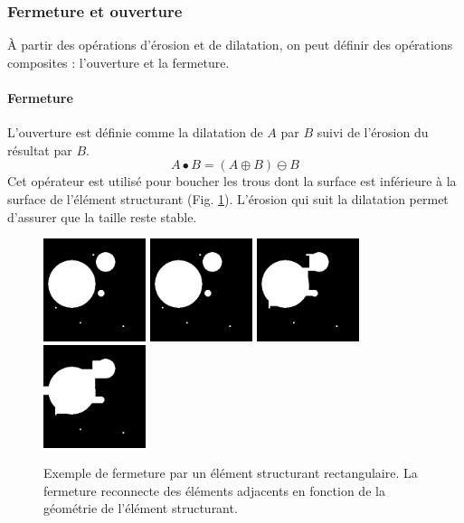   \subsubsection{Fermeture et ouverture}
  À partir des opérations d'érosion et de dilatation, on peut définir des opérations composites : l'ouverture et la fermeture.
  \paragraph{Fermeture}
  L'ouverture est définie comme la dilatation de $A$ par $B$ suivi de l'érosion du résultat par $B$.
  \begin{equation}
   A \bullet B = (A \oplus B) \ominus B
  \end{equation}  
  Cet opérateur est utilisé pour boucher les trous dont la surface est inférieure à la surface de l'élément structurant (Fig. \ref{fig:morpho_femerture}). L'érosion qui suit la dilatation permet d'assurer que la taille reste stable.
  
  \begin{figure}[h]
    \centering
    \includegraphics[height=3cm]{Images/morpho_init.png}
    \includegraphics[height=3cm]{Images/morpho_close_k5.png}
    \includegraphics[height=3cm]{Images/morpho_close_k21.png}
    \includegraphics[height=3cm]{Images/morpho_close_k31.png}
    \caption{Exemple de fermeture par un élément structurant rectangulaire. La fermeture reconnecte des éléments adjacents en fonction de la géométrie de l'élément structurant.}
    \label{fig:morpho_femerture}
  \end{figure}
  
